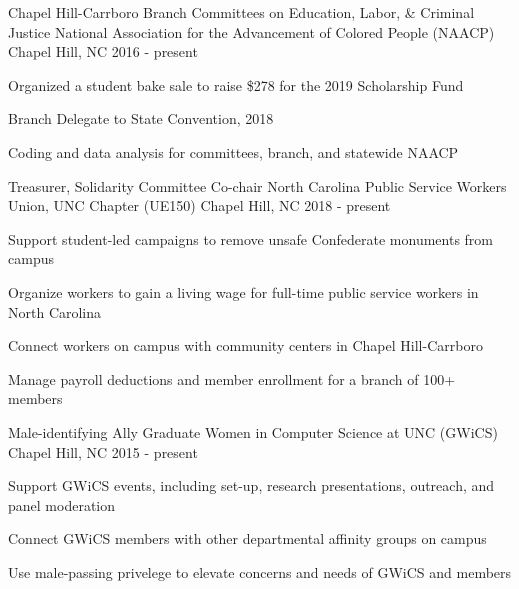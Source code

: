 
\begin{cventries}
  \cventry
    {Chapel Hill-Carrboro Branch Committees on Education, Labor, \& Criminal Justice} %
    {National Association for the Advancement of Colored People (NAACP)} %
    {Chapel Hill, NC} %
    {2016 - present} %
    {
      \begin{cvitems} %
	\item {Organized a student bake sale to raise \$278 for the 2019 Scholarship Fund}
	\item {Branch Delegate to State Convention, 2018}
	\item {Coding and data analysis for committees, branch, and statewide NAACP}
      \end{cvitems}
    }

  \cventry
    {Treasurer, Solidarity Committee Co-chair} %
    {North Carolina Public Service Workers Union, UNC Chapter (UE150)} %
    {Chapel Hill, NC} %
    {2018 - present} %
    {
      \begin{cvitems} %
	\item {Support student-led campaigns to remove unsafe Confederate monuments from campus}
	\item {Organize workers to gain a living wage for full-time public service workers in North Carolina}
	\item {Connect workers on campus with community centers in Chapel Hill-Carrboro}
        \item {Manage payroll deductions and member enrollment for a branch of 100+ members}
      \end{cvitems}
    }
   
  \cventry
    {Male-identifying Ally} %
    {Graduate Women in Computer Science at UNC (GWiCS)} %
    {Chapel Hill, NC} %
    {2015 - present} %
    {
      \begin{cvitems} %
	\item {Support GWiCS events, including set-up, research presentations, outreach, and panel moderation}
	\item {Connect GWiCS members with other departmental affinity groups on campus}
	\item {Use male-passing privelege to elevate concerns and needs of GWiCS and members}
      \end{cvitems}
    }


\end{cventries}
